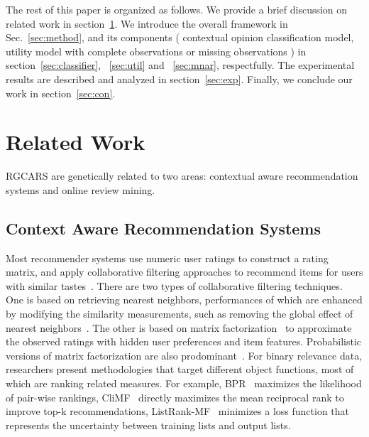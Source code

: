 \documentclass[sigconf]{acmart}
\begin{document}
The rest of this paper is organized as follows.  We provide a brief discussion on related work in section~\ref{sec:related}. We introduce the overall framework in Sec.~\ref{sec:method}, and its components ( contextual opinion classification model, utility model with complete observations or missing observations ) in section~\ref{sec:classifier}, ~\ref{sec:util} and ~\ref{sec:mnar}, respectfully. The experimental results are described and analyzed in section~\ref{sec:exp}. Finally, we conclude our work in section~\ref{sec:con}.

\section{Related Work}\label{sec:related}
%
RGCARS are genetically related to two areas: contextual aware recommendation systems and online review mining.

\subsection{Context Aware Recommendation Systems}

Most recommender systems use numeric user ratings to construct a rating matrix, and apply collaborative filtering approaches to recommend items for users with similar tastes~\cite{Bobadilla2013Recommender}. There are two types of collaborative filtering techniques. One is based on retrieving nearest neighbors, performances of which are enhanced by modifying the similarity measurements, such as removing the global effect of nearest neighbors~\cite{Bell2007Scalable}. The other is based on matrix factorization~\cite{Koren2009Matrix} to approximate the observed ratings with hidden user preferences and item features. Probabilistic versions of matrix factorization are also prodominant~\cite{salakhutdinov2008probabilistic}. For binary relevance data, researchers present methodologies that target different object functions, most of which are ranking related measures. For example, BPR~\cite{Rendle2009BPR} maximizes the likelihood of pair-wise rankings, CliMF~\cite{Shi2012CLiMF} directly maximizes the mean reciprocal rank to improve top-k recommendations, ListRank-MF~\cite{Shi2010Listwise} minimizes a loss function that  represents the uncertainty between training lists and output lists.
\end{document}

